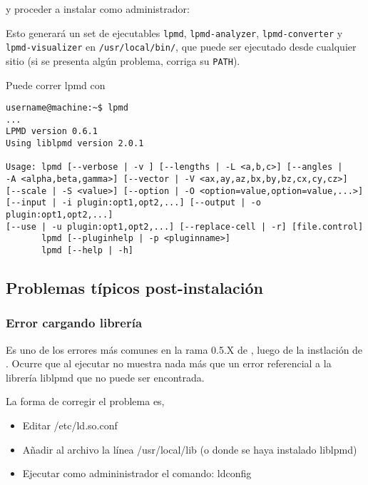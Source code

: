 
y proceder a instalar como administrador:


Esto generar\'a un set de ejecutables \verb|lpmd|, \verb|lpmd-analyzer|, \verb|lpmd-converter| y \verb|lpmd-visualizer| en \verb|/usr/local/bin/|, que puede ser ejecutado desde cualquier sitio (si se presenta alg\'un problema, corriga su \verb|PATH|).

Puede correr lpmd con

\begin{verbatim}
username@machine:~$ lpmd
...
LPMD version 0.6.1
Using liblpmd version 2.0.1

Usage: lpmd [--verbose | -v ] [--lengths | -L <a,b,c>] [--angles | 
-A <alpha,beta,gamma>] [--vector | -V <ax,ay,az,bx,by,bz,cx,cy,cz>] 
[--scale | -S <value>] [--option | -O <option=value,option=value,...>] 
[--input | -i plugin:opt1,opt2,...] [--output | -o plugin:opt1,opt2,...] 
[--use | -u plugin:opt1,opt2,...] [--replace-cell | -r] [file.control]
       lpmd [--pluginhelp | -p <pluginname>]
       lpmd [--help | -h]
\end{verbatim}

\subsection{Problemas t\'ipicos post-instalaci\'on}

\subsubsection{Error cargando librer\'ia}

Es uno de los errores m\'as comunes en la rama 0.5.X de {\lpmd}, luego de la instlaci\'on de {\lpmd}. Ocurre que al ejecutar {\lpmd} no muestra nada m\'as que un error referencial a la librer\'ia liblpmd que no puede ser encontrada.

La forma de corregir el problema es,

\begin{itemize}
 \item Editar /etc/ld.so.conf
 \item A\~nadir al archivo la l\'inea /usr/local/lib (o donde se haya instalado liblpmd)
 \item Ejecutar como admininistrador el comando: ldconfig
\end{itemize}

